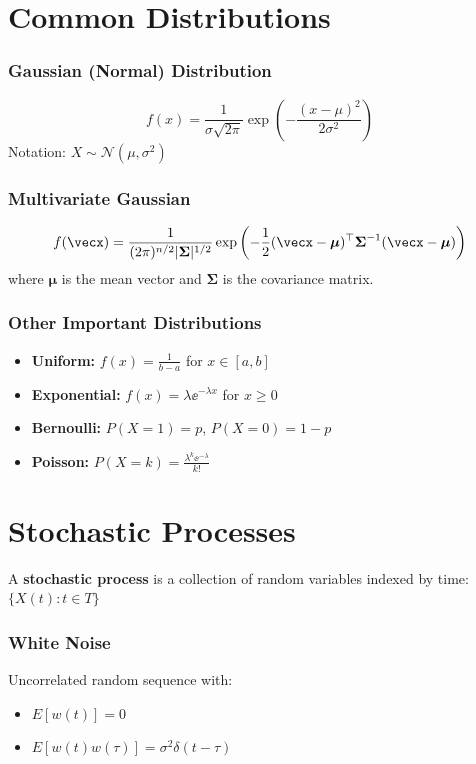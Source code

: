\section{Common Distributions}

\subsubsection{Gaussian (Normal) Distribution}
\begin{equation}
f(x) = \frac{1}{\sigma\sqrt{2\pi}} \exp\left(-\frac{(x-\mu)^2}{2\sigma^2}\right)
\end{equation}
Notation: $X \sim \mathcal{N}(\mu, \sigma^2)$

\subsubsection{Multivariate Gaussian}
\begin{equation}
f(\vecx) = \frac{1}{(2\pi)^{n/2}|\boldsymbol{\Sigma}|^{1/2}} \exp\left(-\frac{1}{2}(\vecx-\boldsymbol{\mu})^\top\boldsymbol{\Sigma}^{-1}(\vecx-\boldsymbol{\mu})\right)
\end{equation}
where $\boldsymbol{\mu}$ is the mean vector and $\boldsymbol{\Sigma}$ is the covariance matrix.

\subsubsection{Other Important Distributions}
\begin{itemize}
    \item \textbf{Uniform:} $f(x) = \frac{1}{b-a}$ for $x \in [a,b]$
    \item \textbf{Exponential:} $f(x) = \lambda\ee^{-\lambda x}$ for $x \geq 0$
    \item \textbf{Bernoulli:} $P(X=1) = p$, $P(X=0) = 1-p$
    \item \textbf{Poisson:} $P(X=k) = \frac{\lambda^k \ee^{-\lambda}}{k!}$
\end{itemize}

\section{Stochastic Processes}

A \textbf{stochastic process} is a collection of random variables indexed by time: $\{X(t) : t \in T\}$

\subsubsection{White Noise}
Uncorrelated random sequence with:
\begin{itemize}
    \item $E[w(t)] = 0$
    \item $E[w(t)w(\tau)] = \sigma^2\delta(t-\tau)$
\end{itemize}

